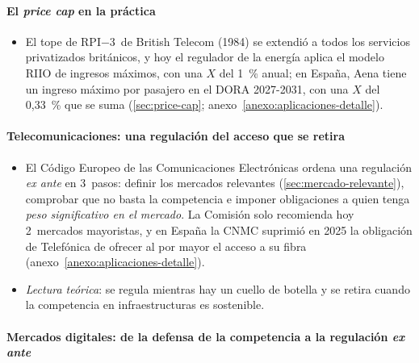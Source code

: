 \documentclass[11pt]{article}
\begin{document}
\paragraph{El \emph{price cap} en la práctica}

\begin{itemize}
\item El tope de RPI$-$3~de British Telecom (1984) se extendió a todos los servicios privatizados británicos, y hoy el regulador de la energía aplica el modelo RIIO de ingresos máximos, con una $X$ del 1~\% anual\nocite{Ofgem2025RIIO3ET}; en España, Aena tiene un ingreso máximo por pasajero en el DORA 2027-2031, con una $X$ del 0,33~\% que se suma (\ref{sec:price-cap}; anexo~\ref{anexo:aplicaciones-detalle}).
\end{itemize}

\paragraph{Telecomunicaciones: una regulación del acceso que se retira}

\begin{itemize}
\item El Código Europeo de las Comunicaciones Electrónicas ordena una regulación \emph{ex ante} en 3~pasos: definir los mercados relevantes (\ref{sec:mercado-relevante}), comprobar que no basta la competencia e imponer obligaciones a quien tenga \emph{peso significativo en el mercado}\nocite{UE2018CECE}. La Comisión solo recomienda hoy 2~mercados mayoristas, y en España la CNMC suprimió en 2025 la obligación de Telefónica de ofrecer al por mayor el acceso a su fibra (anexo~\ref{anexo:aplicaciones-detalle}).
\item \emph{Lectura teórica}: se regula mientras hay un cuello de botella y se retira cuando la competencia en infraestructuras es sostenible.
\end{itemize}

\paragraph{Mercados digitales: de la defensa de la competencia a la regulación \emph{ex ante}}
\end{document}
